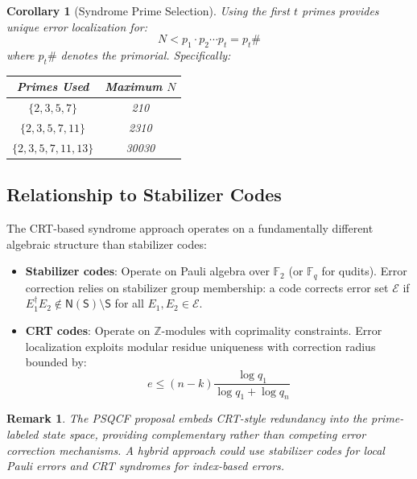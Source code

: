 \documentclass[12pt,a4paper]{article}
\newtheorem{corollary}[theorem]{Corollary}
\newtheorem{remark}{Remark}[section]
\begin{document}
\begin{corollary}[Syndrome Prime Selection]
Using the first $t$ primes provides unique error localization for:
\begin{equation}
    N < p_1 \cdot p_2 \cdots p_t = p_t\#
\end{equation}
where $p_t\#$ denotes the primorial. Specifically:
\begin{center}
\begin{tabular}{cc}
\toprule
Primes Used & Maximum $N$ \\
\midrule
$\{2, 3, 5, 7\}$ & 210 \\
$\{2, 3, 5, 7, 11\}$ & 2310 \\
$\{2, 3, 5, 7, 11, 13\}$ & 30030 \\
\bottomrule
\end{tabular}
\end{center}
\end{corollary}

\subsection{Relationship to Stabilizer Codes}

The CRT-based syndrome approach operates on a fundamentally different algebraic structure than stabilizer codes:

\begin{itemize}
    \item \textbf{Stabilizer codes}: Operate on Pauli algebra over $\mathbb{F}_2$ (or $\mathbb{F}_q$ for qudits). Error correction relies on stabilizer group membership: a code corrects error set $\mathcal{E}$ if $E_1^\dagger E_2 \notin \mathsf{N(S)} \setminus \mathsf{S}$ for all $E_1, E_2 \in \mathcal{E}$.

    \item \textbf{CRT codes}: Operate on $\mathbb{Z}$-modules with coprimality constraints. Error localization exploits modular residue uniqueness with correction radius bounded by:
    \begin{equation}
        e \leq (n-k) \frac{\log q_1}{\log q_1 + \log q_n}
    \end{equation}
\end{itemize}

\begin{remark}
The PSQCF proposal embeds CRT-style redundancy into the prime-labeled state space, providing \emph{complementary} rather than competing error correction mechanisms. A hybrid approach could use stabilizer codes for local Pauli errors and CRT syndromes for index-based errors.
\end{remark}
\end{document}

